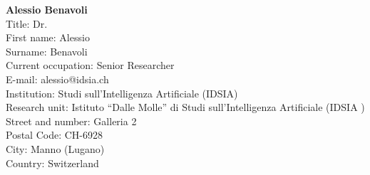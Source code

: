 \documentclass[11pt,dvipsnames,usenames,a4paper]{article}
\begin{document}

{\bf Alessio Benavoli}\\
Title: Dr.\\
First name: Alessio\\
Surname:  Benavoli\\
Current occupation: Senior Researcher \\
E-mail: alessio@idsia.ch\\
Institution: Studi sull'Intelligenza Artificiale (IDSIA)\\
Research unit: Istituto ``Dalle Molle'' di 
Studi sull'Intelligenza Artificiale (IDSIA )\\
Street and number: Galleria 2\\
Postal Code: CH-6928\\
City: Manno (Lugano)\\
Country: Switzerland\\[-7pt]

\end{document}
